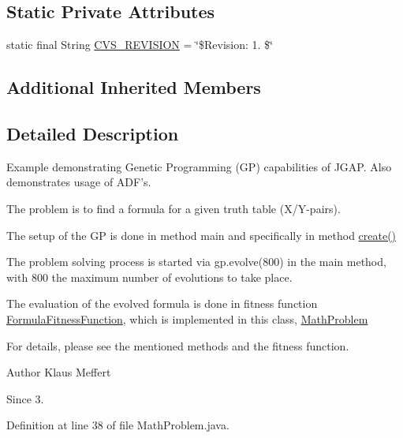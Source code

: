 \subsection*{Static Private Attributes}
\begin{DoxyCompactItemize}
\item 
static final String \hyperlink{classexamples_1_1gp_1_1_math_problem_adf8e473d74650bddfad27593c814df45}{C\-V\-S\-\_\-\-R\-E\-V\-I\-S\-I\-O\-N} = \char`\"{}\$Revision\-: 1. \$\char`\"{}
\end{DoxyCompactItemize}
\subsection*{Additional Inherited Members}


\subsection{Detailed Description}
Example demonstrating Genetic Programming (G\-P) capabilities of J\-G\-A\-P. Also demonstrates usage of A\-D\-F's.\par
 The problem is to find a formula for a given truth table (X/\-Y-\/pairs). 


\begin{DoxyItemize}
\item The setup of the G\-P is done in method main and specifically in method \hyperlink{classexamples_1_1gp_1_1_math_problem_a4d7aa38be65189ab69155963e170c922}{create()} 
\item The problem solving process is started via gp.\-evolve(800) in the main method, with 800 the maximum number of evolutions to take place. 
\item The evaluation of the evolved formula is done in fitness function \hyperlink{classexamples_1_1gp_1_1_math_problem_1_1_formula_fitness_function}{Formula\-Fitness\-Function}, which is implemented in this class, \hyperlink{classexamples_1_1gp_1_1_math_problem}{Math\-Problem} 
\end{DoxyItemize}\par
 For details, please see the mentioned methods and the fitness function. 

\begin{DoxyAuthor}{Author}
Klaus Meffert 
\end{DoxyAuthor}
\begin{DoxySince}{Since}
3. 
\end{DoxySince}


Definition at line 38 of file Math\-Problem.\-java.



